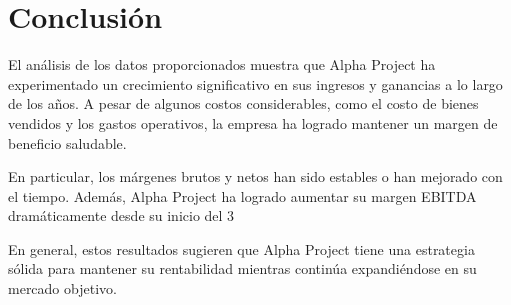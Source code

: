 \section{Conclusión}

El análisis de los datos proporcionados muestra que Alpha Project ha experimentado un crecimiento significativo en sus ingresos y ganancias a lo largo de los años. A pesar de algunos costos considerables, como el costo de bienes vendidos y los gastos operativos, la empresa ha logrado mantener un margen de beneficio saludable.

En particular, los márgenes brutos y netos han sido estables o han mejorado con el tiempo. Además, Alpha Project ha logrado aumentar su margen EBITDA dramáticamente desde su inicio del 3%

En general, estos resultados sugieren que Alpha Project tiene una estrategia sólida para mantener su rentabilidad mientras continúa expandiéndose en su mercado objetivo.